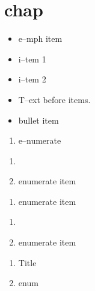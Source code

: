 \documentclass{book}
\begin{document}
\label{anchor:Top}%
\chapter{chap}
\label{anchor:chapter}%

\begin{itemize}[label=-]
\item {}%
e--mph item
\end{itemize}

\begin{itemize}[label=\textbullet{}]
\item {}%
i--tem 1
\item {}%
i--tem 2
\end{itemize}

\begin{itemize}
\item T--ext before items.
\item {}%
bullet item
\end{itemize}

\begin{enumerate}[start=1]

\item e--numerate
\end{enumerate}

\begin{enumerate}[start=1]
\item 
{}%

\item enumerate item
\end{enumerate}

\begin{enumerate}[start=1]

\item {}%
enumerate item
\end{enumerate}

\begin{enumerate}[start=1]
\item {}%

\item enumerate item
\end{enumerate}

\begin{enumerate}[start=1]
\item Title
\item {}%
enum
\end{enumerate}
\end{document}
